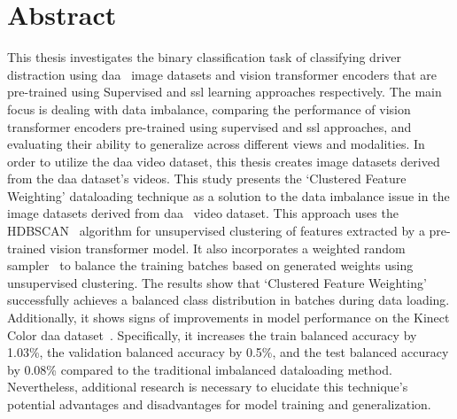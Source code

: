 \documentclass{report} %
\begin{document}
\chapter*{Abstract}
This thesis investigates the binary classification task of classifying driver distraction using \gls{daa}~\citep{martin2019drive_and_act_2019_iccv} image datasets and vision transformer encoders that are pre-trained using Supervised and \gls{ssl} learning approaches respectively. The main focus is dealing with data imbalance, comparing the performance of vision transformer encoders pre-trained using supervised and \gls{ssl} approaches, and evaluating their ability to generalize across different views and modalities. In order to utilize the \gls{daa} video dataset, this thesis creates image datasets derived from the \gls{daa} dataset's videos. This study presents the `Clustered Feature Weighting' dataloading technique as a solution to the data imbalance issue in the image datasets derived from \gls{daa}~\citep{martin2019drive_and_act_2019_iccv} video dataset. This approach uses the HDBSCAN~\citep{HDBSCAN_algo_campello2013density} algorithm for unsupervised clustering of features extracted by a pre-trained vision transformer model. It also incorporates a weighted random sampler~\citep{pytorchweightedrandomsampler} to balance the training batches based on generated weights using unsupervised clustering. The results show that `Clustered Feature Weighting' successfully achieves a balanced class distribution in batches during data loading. Additionally, it shows signs of improvements in model performance on the Kinect Color \gls{daa} dataset~\citep{martin2019drive_and_act_2019_iccv}. Specifically, it increases the train balanced accuracy by 1.03\%, the validation balanced accuracy by 0.5\%, and the test balanced accuracy by 0.08\% compared to the traditional imbalanced dataloading method. Nevertheless, additional research is necessary to elucidate this technique's potential advantages and disadvantages for model training and generalization.
\end{document}
